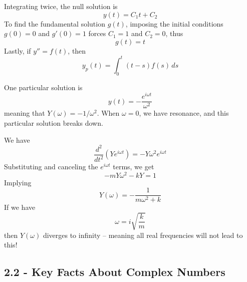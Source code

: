 \documentclass[a4paper]{article}
\begin{document}
Integrating twice, the null solution is
\[
	y \!\left( t \right) = C_{1} t + C_{2}
\]
To find the fundamental solution \(g \!\left( t \right) \), imposing the initial conditions \(g \!\left( 0 \right) = 0\) and \(g'\!\left( 0 \right) = 1\) forces \(C_{1} = 1\) and \(C_{2} = 0\), thus
\[
	g \!\left( t \right) = t
\]
Lastly, if \(y'' = f \!\left( t \right) \), then
\[
	y_{p}\!\left( t \right) = \int^{t}_{0} \!\left( t - s \right) f \!\left( s \right)  \, ds 
\]

One particular solution is
\[
	y \!\left( t \right) = -\frac{e^{i \omega t}}{\omega^{2}}
\]
meaning that \(Y \!\left( \omega  \right) = - 1 / \omega^{2}\). When \(\omega = 0\), we have resonance, and this particular solution breaks down.

\vspace{12pt}


We have
\[
	\frac{d^{2} }{d t^{2}} \!\left( Y e^{i \omega t} \right) = - Y \omega^{2} e^{i \omega t}
\]
Substituting and canceling the \(e^{i \omega t}\) terms, we get
\[
	-mY \omega^{2} - kY = 1
\]
Implying
\[
	Y \!\left( \omega  \right) = -\frac{1}{m \omega^{2} + k}
\]
If we have
\[
	\omega = i \sqrt{\frac{k}{m}}
\]
then \(Y \!\left( \omega  \right) \) diverges to infinity -- meaning all real frequencies will not lead to this!

\newpage

\subsection{\textsf{2.2 - Key Facts About Complex Numbers}}

\end{document}
